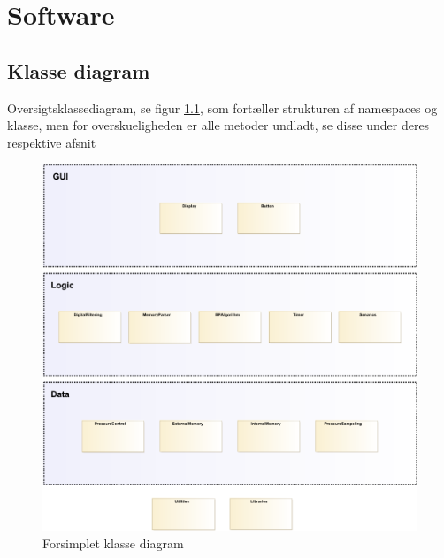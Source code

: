 \chapter{Software}

\section{Klasse diagram}
Oversigtsklassediagram, se figur \ref{fig:classDiagramSimple}, som fortæller strukturen af namespaces og klasse, men for overskueligheden er alle metoder undladt, se disse under deres respektive afsnit
\begin{figure}[H]
	\includegraphics[width=\textwidth]{klassediagram_forsimplet-crop.pdf}
	\caption{Forsimplet klasse diagram}\label{fig:classDiagramSimple}
\end{figure}
\newpage







